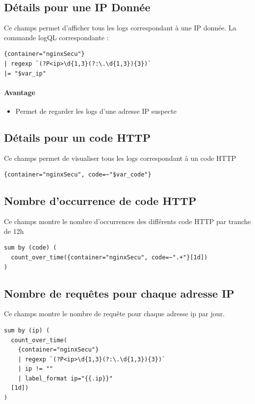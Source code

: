\documentclass[french, 12pt]{article}%
\newcommand{\itemE}{\item[$\bullet$]}
\begin{document}
\subsection{Détails pour une IP Donnée}
Ce champs permet d'afficher tous les logs correspondant à une IP donnée. La commande logQL correspondante : 

\begin{lstlisting}[style=commande]
{container="nginxSecu"}
| regexp `(?P<ip>\d{1,3}(?:\.\d{1,3}){3})`
|= "$var_ip"
\end{lstlisting}

\paragraph{Avantage }
\begin{itemize}
\itemE Permet de regarder les logs d'une adresse IP suspecte
\end{itemize}

\subsection{Détails pour un code HTTP}

Ce champs permet de visualiser tous les logs correspondant à un code HTTP

\begin{lstlisting}[style=commande]
{container="nginxSecu", code=~"$var_code"}
\end{lstlisting}

\subsection{Nombre d'occurrence de code HTTP}

Ce champs montre le nombre d'occurrences des différents code HTTP par tranche de 12h

\begin{lstlisting}[style=commande]
sum by (code) (
  count_over_time({container="nginxSecu", code=~".+"}[1d])
)
\end{lstlisting}


\subsection{Nombre de requêtes pour chaque adresse IP}

Ce champs montre le nombre de requête pour chaque adresse ip par jour.

\begin{lstlisting}[style=commande]
sum by (ip) (
  count_over_time(
    {container="nginxSecu"}
    | regexp `(?P<ip>\d{1,3}(?:\.\d{1,3}){3})`
    | ip != ""
    | label_format ip="{{.ip}}"
  [1d])
)
\end{lstlisting}
\end{document}
